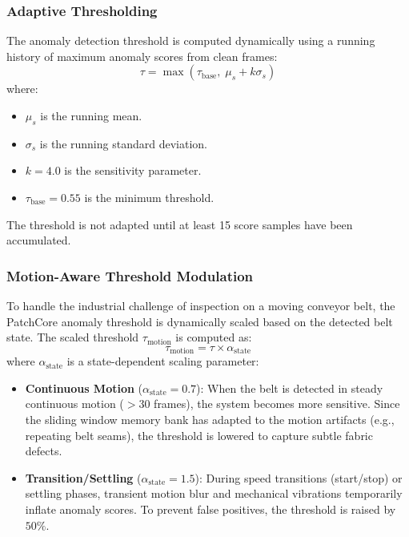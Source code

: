 \documentclass{ieeeaccess}
\begin{document}
\subsubsection{Adaptive Thresholding}
The anomaly detection threshold is computed dynamically using a running history of maximum anomaly scores from clean frames:
\begin{equation}
\tau = \max(\tau_{\text{base}},\; \mu_s + k\sigma_s)
\label{eq:threshold}
\end{equation}
where:
\begin{itemize}
    \item $\mu_s$ is the running mean.
    \item $\sigma_s$ is the running standard deviation.
    \item $k = 4.0$ is the sensitivity parameter.
    \item $\tau_{\text{base}} = 0.55$ is the minimum threshold.
\end{itemize}
The threshold is not adapted until at least 15 score samples have been accumulated.

\subsubsection{Motion-Aware Threshold Modulation}
To handle the industrial challenge of inspection on a moving conveyor belt, the PatchCore anomaly threshold is dynamically scaled based on the detected belt state. The scaled threshold $\tau_{\text{motion}}$ is computed as:
\begin{equation}
\tau_{\text{motion}} = \tau \times \alpha_{\text{state}}
\label{eq:motion_threshold}
\end{equation}
where $\alpha_{\text{state}}$ is a state-dependent scaling parameter:
\begin{itemize}
    \item \textbf{Continuous Motion} ($\alpha_{\text{state}} = 0.7$): When the belt is detected in steady continuous motion ($>30$ frames), the system becomes more sensitive. Since the sliding window memory bank has adapted to the motion artifacts (e.g., repeating belt seams), the threshold is lowered to capture subtle fabric defects.
    \item \textbf{Transition/Settling} ($\alpha_{\text{state}} = 1.5$): During speed transitions (start/stop) or settling phases, transient motion blur and mechanical vibrations temporarily inflate anomaly scores. To prevent false positives, the threshold is raised by $50\%$.
\end{itemize}
\end{document}
